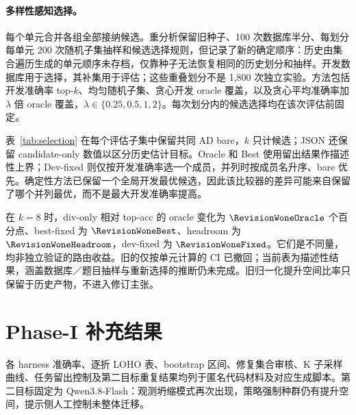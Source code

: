 \paragraph{多样性感知选择。}每个单元合并各组全部接纳候选。重分析保留旧种子、100 次数据库半分、每划分每单元 200 次随机子集抽样和候选选择规则，但记录了新的确定顺序：历史由集合遍历生成的单元顺序未存档，仅靠种子无法恢复相同的历史划分和抽样。开发数据库用于选择，其补集用于评估；这些重叠划分不是 1,800 次独立实验。方法包括开发准确率 top-$k$、均匀随机子集、贪心开发 oracle 覆盖，以及贪心平均准确率加 $\lambda$ 倍 oracle 覆盖，$\lambda\in\{0.25,0.5,1,2\}$。每次划分内的候选选择均在该次评估前固定。

表~\ref{tab:selection} 在每个评估子集中保留共同 AD bare，$k$ 只计候选；JSON 还保留 candidate-only 数值以区分历史估计目标。Oracle 和 Best 使用留出结果作描述性上界；Dev-fixed 则仅按开发准确率选一个成员，并列时按成员名升序、bare 优先。确定性方法已保留一个全局开发最优候选，因此该比较器的差异可能来自保留了哪个并列最优，而不是最大开发准确率提高。

在 $k=8$ 时，div-only 相对 top-acc 的 oracle 变化为 $\RevisionWoneOracle$ 个百分点、best-fixed 为 $\RevisionWoneBest$、headroom 为 $\RevisionWoneHeadroom$，dev-fixed 为 $\RevisionWoneFixed$。它们是不同量，均非独立验证的路由收益。旧的仅按单元计算的 CI 已撤回；当前表为描述性结果，涵盖数据库／题目抽样与重新选择的推断仍未完成。旧归一化提升空间比率只保留于历史产物，不进入修订主张。
\begin{table}[t]\centering\small

\caption{canonical 描述性 W1 重分析。每池含 $k$ 个已选候选及共同 bare；对 18 单元、100 个重叠数据库划分取均值，无 CI。Dev-fixed 仅在开发数据上选择；Best 使用留出结果。}\label{tab:selection}
\end{table}

\section{Phase-I 补充结果}\label{app:phase1-results}
各 harness 准确率、逐折 LOHO 表、bootstrap 区间、修复集合审核、K 子采样曲线、任务留出控制及第二目标重复结果均列于匿名代码材料及对应生成脚本。第二目标固定为 Qwen3.8-Flash：观测坍缩模式再次出现，策略强制种群仍有提升空间，提示侧人工控制未整体迁移。

